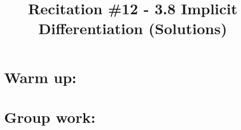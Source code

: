 \documentclass[nooutcomes]{ximera}
\title{Recitation \#12 - 3.8 Implicit Differentiation (Solutions)}
\begin{document}
\begin{abstract}		\end{abstract}
\maketitle

\section*{Warm up:} 

	\begin{freeResponse}
	
	\end{freeResponse}	
	
	
	
	
	

\section*{Group work:}
\end{document}
